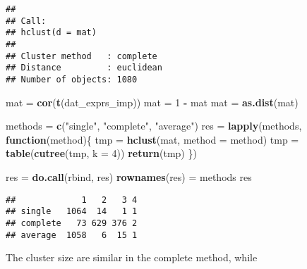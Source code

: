 \documentclass[]{article}
\newenvironment{Shaded}{\begin{snugshade}}{\end{snugshade}}
\newcommand{\KeywordTok}[1]{\textcolor[rgb]{0.13,0.29,0.53}{\textbf{#1}}}
\newcommand{\DataTypeTok}[1]{\textcolor[rgb]{0.13,0.29,0.53}{#1}}
\newcommand{\DecValTok}[1]{\textcolor[rgb]{0.00,0.00,0.81}{#1}}
\newcommand{\StringTok}[1]{\textcolor[rgb]{0.31,0.60,0.02}{#1}}
\newcommand{\ControlFlowTok}[1]{\textcolor[rgb]{0.13,0.29,0.53}{\textbf{#1}}}
\newcommand{\OperatorTok}[1]{\textcolor[rgb]{0.81,0.36,0.00}{\textbf{#1}}}
\newcommand{\NormalTok}[1]{#1}
\begin{document}
\begin{verbatim}
## 
## Call:
## hclust(d = mat)
## 
## Cluster method   : complete 
## Distance         : euclidean 
## Number of objects: 1080
\end{verbatim}

\begin{Shaded}
\begin{Highlighting}[]
\NormalTok{mat =}\StringTok{ }\KeywordTok{cor}\NormalTok{(}\KeywordTok{t}\NormalTok{(dat_exprs_imp))}
\NormalTok{mat =}\StringTok{ }\DecValTok{1} \OperatorTok{-}\StringTok{ }\NormalTok{mat}
\NormalTok{mat =}\StringTok{ }\KeywordTok{as.dist}\NormalTok{(mat)}

\NormalTok{methods =}\StringTok{ }\KeywordTok{c}\NormalTok{(}\StringTok{"single"}\NormalTok{, }\StringTok{"complete"}\NormalTok{, }\StringTok{"average"}\NormalTok{)}
\NormalTok{res =}\StringTok{ }\KeywordTok{lapply}\NormalTok{(methods, }\ControlFlowTok{function}\NormalTok{(method)\{}
\NormalTok{    tmp =}\StringTok{ }\KeywordTok{hclust}\NormalTok{(mat, }\DataTypeTok{method =}\NormalTok{ method)}
\NormalTok{    tmp =}\StringTok{ }\KeywordTok{table}\NormalTok{(}\KeywordTok{cutree}\NormalTok{(tmp, }\DataTypeTok{k =} \DecValTok{4}\NormalTok{))}
    \KeywordTok{return}\NormalTok{(tmp)}
\NormalTok{\})}

\NormalTok{res =}\StringTok{ }\KeywordTok{do.call}\NormalTok{(rbind, res)}
\KeywordTok{rownames}\NormalTok{(res) =}\StringTok{ }\NormalTok{methods}
\NormalTok{res}
\end{Highlighting}
\end{Shaded}

\begin{verbatim}
##             1   2   3 4
## single   1064  14   1 1
## complete   73 629 376 2
## average  1058   6  15 1
\end{verbatim}

The cluster size are similar in the complete method, while
\end{document}
